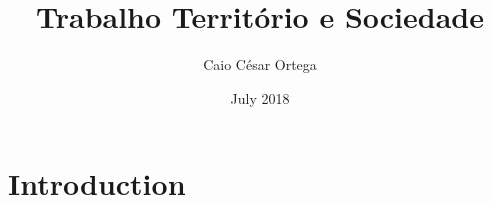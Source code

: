 \documentclass{article}
\title{Trabalho Território e Sociedade}
\author{Caio César Ortega}
\date{July 2018}
\begin{document}
\maketitle

\section{Introduction}
\end{document}
